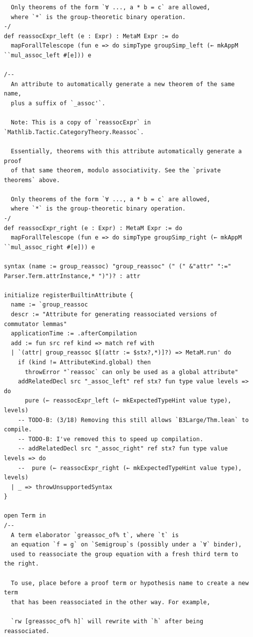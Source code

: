 \begin{Verbatim}
  Only theorems of the form `∀ ..., a * b = c` are allowed,
  where `*` is the group-theoretic binary operation.
-/
def reassocExpr_left (e : Expr) : MetaM Expr := do
  mapForallTelescope (fun e => do simpType groupSimp_left (← mkAppM ``mul_assoc_left #[e])) e

/--
  An attribute to automatically generate a new theorem of the same name,
  plus a suffix of `_assoc'`.

  Note: This is a copy of `reassocExpr` in `Mathlib.Tactic.CategoryTheory.Reassoc`.

  Essentially, theorems with this attribute automatically generate a proof
  of that same theorem, modulo associativity. See the `private theorems` above.

  Only theorems of the form `∀ ..., a * b = c` are allowed,
  where `*` is the group-theoretic binary operation.
-/
def reassocExpr_right (e : Expr) : MetaM Expr := do
  mapForallTelescope (fun e => do simpType groupSimp_right (← mkAppM ``mul_assoc_right #[e])) e

syntax (name := group_reassoc) "group_reassoc" (" (" &"attr" ":=" Parser.Term.attrInstance,* ")")? : attr

initialize registerBuiltinAttribute {
  name := `group_reassoc
  descr := "Attribute for generating reassociated versions of commutator lemmas"
  applicationTime := .afterCompilation
  add := fun src ref kind => match ref with
  | `(attr| group_reassoc $[(attr := $stx?,*)]?) => MetaM.run' do
    if (kind != AttributeKind.global) then
      throwError "`reassoc` can only be used as a global attribute"
    addRelatedDecl src "_assoc_left" ref stx? fun type value levels => do
      pure (← reassocExpr_left (← mkExpectedTypeHint value type), levels)
    -- TODO-B: (3/18) Removing this still allows `B3Large/Thm.lean` to compile.
    -- TODO-B: I've removed this to speed up compilation.
    -- addRelatedDecl src "_assoc_right" ref stx? fun type value levels => do
    --  pure (← reassocExpr_right (← mkExpectedTypeHint value type), levels)
  | _ => throwUnsupportedSyntax
}

open Term in
/--
  A term elaborator `greassoc_of% t`, where `t` is
  an equation `f = g` on `Semigroup`s (possibly under a `∀` binder),
  used to reassociate the group equation with a fresh third term to the right.

  To use, place before a proof term or hypothesis name to create a new term
  that has been reassociated in the other way. For example,

  `rw [greassoc_of% h]` will rewrite with `h` after being reassociated.


\end{Verbatim}
